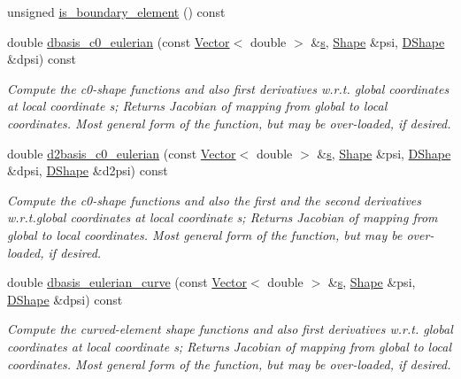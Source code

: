 \begin{DoxyCompactItemize}
unsigned \hyperlink{classoomph_1_1C1CurvedElementBase_a819873b0790335875e6c009d63615464}{is\+\_\+boundary\+\_\+element} () const
\item 
double \hyperlink{classoomph_1_1C1CurvedElementBase_a48932300808586ba1773a54a6ed768e4}{dbasis\+\_\+c0\+\_\+eulerian} (const \hyperlink{classoomph_1_1Vector}{Vector}$<$ double $>$ \&\hyperlink{cfortran_8h_ab7123126e4885ef647dd9c6e3807a21c}{s}, \hyperlink{classoomph_1_1Shape}{Shape} \&psi, \hyperlink{classoomph_1_1DShape}{D\+Shape} \&dpsi) const
\begin{DoxyCompactList}\small\item\em Compute the c0-\/shape functions and also first derivatives w.\+r.\+t. global coordinates at local coordinate s; Returns Jacobian of mapping from global to local coordinates. Most general form of the function, but may be over-\/loaded, if desired. \end{DoxyCompactList}\item 
double \hyperlink{classoomph_1_1C1CurvedElementBase_ad4a034b3edc770df5b37cf8a15595fd8}{d2basis\+\_\+c0\+\_\+eulerian} (const \hyperlink{classoomph_1_1Vector}{Vector}$<$ double $>$ \&\hyperlink{cfortran_8h_ab7123126e4885ef647dd9c6e3807a21c}{s}, \hyperlink{classoomph_1_1Shape}{Shape} \&psi, \hyperlink{classoomph_1_1DShape}{D\+Shape} \&dpsi, \hyperlink{classoomph_1_1DShape}{D\+Shape} \&d2psi) const
\begin{DoxyCompactList}\small\item\em Compute the c0-\/shape functions and also the first and the second derivatives w.\+r.\+t.\+global coordinates at local coordinate s; Returns Jacobian of mapping from global to local coordinates. Most general form of the function, but may be over-\/loaded, if desired. \end{DoxyCompactList}\item 
double \hyperlink{classoomph_1_1C1CurvedElementBase_aa13f07f1ec64a996149ab7c9e10378a0}{dbasis\+\_\+eulerian\+\_\+curve} (const \hyperlink{classoomph_1_1Vector}{Vector}$<$ double $>$ \&\hyperlink{cfortran_8h_ab7123126e4885ef647dd9c6e3807a21c}{s}, \hyperlink{classoomph_1_1Shape}{Shape} \&psi, \hyperlink{classoomph_1_1DShape}{D\+Shape} \&dpsi) const
\begin{DoxyCompactList}\small\item\em Compute the curved-\/element shape functions and also first derivatives w.\+r.\+t. global coordinates at local coordinate s; Returns Jacobian of mapping from global to local coordinates. Most general form of the function, but may be over-\/loaded, if desired. \end{DoxyCompactList}\item 

\end{DoxyCompactItemize}
